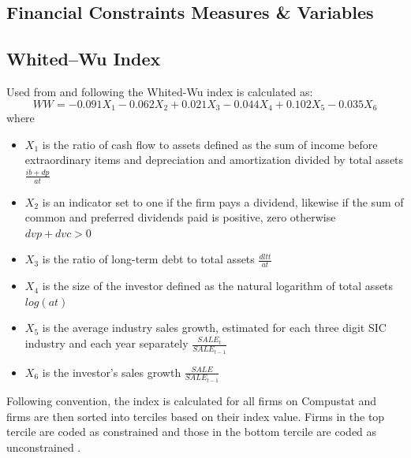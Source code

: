 \documentclass[12pt]{article}
\begin{document}
\begin{appendices}
\renewcommand{\appendixname}{Appendix}

	\section{Financial Constraints Measures \& Variables}

	\subsection*{Whited--Wu Index}
	\noindent Used from \citet[p.543]{Whited2006} and following \citet[p.38]{Farre-mensa2013} the Whited-Wu index is calculated as:
		\begin{equation*}
		WW=-0.091X_{1}-0.062X_{2}+0.021X_{3}-0.044X_{4}+0.102X_{5}-0.035X_{6}
		\end{equation*}
	where
	\begin{itemize}
	\renewcommand\labelitemi{}
		\item $X_{1}$ is the ratio of cash flow to assets defined as the sum of income before extraordinary items and depreciation and amortization divided by total assets $\frac{ib+dp}{at}$
		\item $X_{2}$ is an indicator set to one if the firm pays a dividend, likewise if the sum of common and preferred dividends paid is positive, zero otherwise $dvp+dvc>0$
		\item $X_{3}$ is the ratio of long-term debt to total assets $\frac{dltt}{at}$
		\item $X_{4}$ is the size of the investor defined as the natural logarithm of total assets $log(at)$
		\item $X_{5}$ is the average industry sales growth, estimated for each three digit SIC industry and each year separately $\frac{SALE_{t}}{SALE_{t-1}}$
		\item $X_{6}$ is the investor's sales growth $\frac{SALE}{SALE_{t-1}}$
	\end{itemize}

	\noindent Following convention, the index is calculated for all firms on Compustat and firms are then sorted into terciles based on their index value. Firms in the top tercile are coded as constrained and those in the bottom tercile are coded as unconstrained \citep[p.38]{Farre-mensa2013}. 


\end{appendices}
\end{document}
